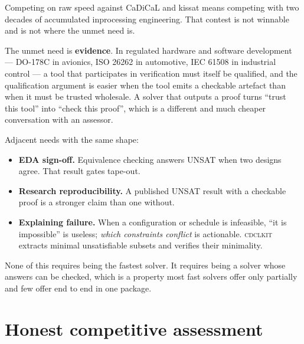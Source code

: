\documentclass[11pt,a4paper]{article}
\newcommand{\cdclkit}{\textsc{cdclkit}}
\begin{document}
Competing on raw speed against CaDiCaL and kissat means competing with two
decades of accumulated inprocessing engineering. That contest is not winnable
and is not where the unmet need is.

The unmet need is \textbf{evidence}. In regulated hardware and software
development --- DO-178C in avionics, ISO 26262 in automotive, IEC 61508 in
industrial control --- a tool that participates in verification must itself be
qualified, and the qualification argument is easier when the tool emits a
checkable artefact than when it must be trusted wholesale. A solver that
outputs a proof turns ``trust this tool'' into ``check this proof'', which is a
different and much cheaper conversation with an assessor.

Adjacent needs with the same shape:

\begin{itemize}
  \item \textbf{EDA sign-off.} Equivalence checking answers UNSAT when two
        designs agree. That result gates tape-out.
  \item \textbf{Research reproducibility.} A published UNSAT result with a
        checkable proof is a stronger claim than one without.
  \item \textbf{Explaining failure.} When a configuration or schedule is
        infeasible, ``it is impossible'' is useless; \emph{which constraints
        conflict} is actionable. \cdclkit{} extracts minimal unsatisfiable
        subsets and verifies their minimality.
\end{itemize}

None of this requires being the fastest solver. It requires being a solver
whose answers can be checked, which is a property most fast solvers offer only
partially and few offer end to end in one package.

\section{Honest competitive assessment}
\end{document}

